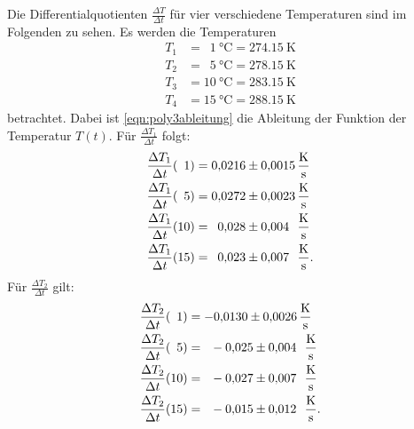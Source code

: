 \noindent Die Differentialquotienten $\frac{\Delta T}{\Delta t}$ für vier verschiedene Temperaturen
sind im Folgenden zu sehen. Es werden die Temperaturen
\begin{align*}
    T_1 &= \phantom{1}\SI{1}{\degreeCelsius} = \SI{274.15}{\kelvin} \\ %
    T_2 &=\phantom{1}\SI{5}{\degreeCelsius} = \SI{278.15}{\kelvin}\\
    T_3 &= \SI{10}{\degreeCelsius} = \SI{283.15}{\kelvin}\\
    T_4 &= \SI{15}{\degreeCelsius} = \SI{288.15}{\kelvin}
\end{align*}
betrachtet.
Dabei ist \eqref{eqn:poly3ableitung}
die Ableitung der Funktion der Temperatur $T(t)$.
Für $\frac{\Delta T_1}{\Delta t}$ folgt:
\begin{align*}
    \frac{\Delta T_1}{\Delta t}(\phantom{1}1) &= \num{0.0216 \pm 0.0015} \, \si{\kelvin\per\second}\\
    \frac{\Delta T_1}{\Delta t}(\phantom{1}5) &= \num{0.0272 \pm 0.0023} \, \si{\kelvin\per\second}\\
    \frac{\Delta T_1}{\Delta t}(10) &= \phantom{1}\num{0.028 \pm 0.004}\phantom{1} \, \si{\kelvin\per\second}\\
    \frac{\Delta T_1}{\Delta t}(15) &= \phantom{1}\num{0.023 \pm 0.007}\phantom{1} \, \si{\kelvin\per\second}.%
\end{align*}
Für $\frac{\Delta T_2}{\Delta t}$ gilt:
\begin{align*}
    \frac{\Delta T_2}{\Delta t}(\phantom{1}1) &= \num{-0.0130 \pm 0.0026} \, \si{\kelvin\per\second}\\ %
    \frac{\Delta T_2}{\Delta t}(\phantom{1}5) &= \phantom{1}\num{-0.025 \pm 0.004}\phantom{1} \, \si{\kelvin\per\second}\\
    \frac{\Delta T_2}{\Delta t}(10) &= \phantom{1}\num{-0.027 \pm 0.007}\phantom{1} \, \si{\kelvin\per\second}\\
    \frac{\Delta T_2}{\Delta t}(15) &= \phantom{1}\num{-0.015 \pm 0.012}\phantom{1} \, \si{\kelvin\per\second}.
\end{align*}

